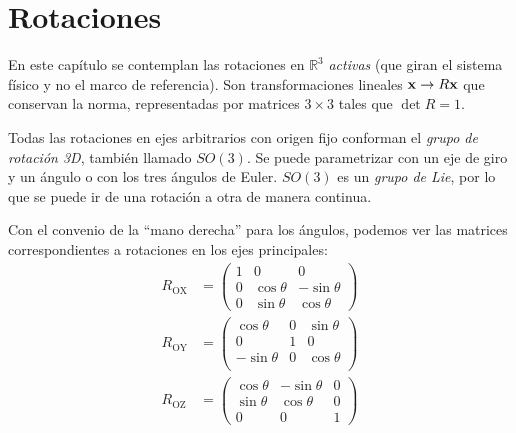 \chapter{Rotaciones}
En este capítulo se contemplan las rotaciones en $\mathbb{R}^3$
\emph{activas} (que giran el sistema físico y no el marco de
referencia). Son transformaciones lineales $\bm{\mathrm{x}} \to R\bm{\mathrm{x}}$ que conservan la norma,
representadas por matrices $3 \times 3$ tales que $\det R = 1$.

Todas las rotaciones en ejes arbitrarios con origen fijo conforman el
\emph{grupo de rotación 3D}, también llamado $SO(3)$. Se puede
parametrizar con un eje de giro y un ángulo o con los tres ángulos de
Euler. $SO(3)$ es un \emph{grupo de Lie}, por lo que se puede ir de
una rotación a otra de manera continua.

Con el convenio de la ``mano derecha'' para los ángulos, podemos ver
las matrices correspondientes a rotaciones en los ejes principales:
\begin{align}
  R_{\text{OX}} &=
  \begin{pmatrix}
    1 & 0 & 0 \\
    0&\cos \theta & -\sin \theta  \\
    0&\sin \theta & \cos \theta  
  \end{pmatrix} \\
  R_{\text{OY}} &=
  \begin{pmatrix}
    \cos \theta &0& \sin \theta  \\
    0 & 1 & 0 \\
    -\sin \theta & 0&\cos \theta  \\
  \end{pmatrix} \\
  R_{\text{OZ}} &=
  \begin{pmatrix}
    \cos \theta & -\sin \theta & 0 \\
    \sin \theta & \cos \theta & 0 \\
    0 & 0 & 1 
  \end{pmatrix}
\end{align}


